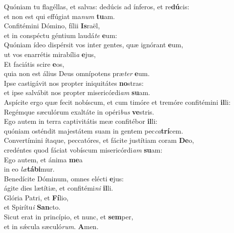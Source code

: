 \evenverse Quóniam tu flagéllas, et salvas: dedúcis ad ínferos, et re\textbf{dú}cis:~\*\\
\evenverse et non est qui effúgiat ma\textit{num} \textbf{tu}am.\\
\oddverse Confitémini Dómino, fílii \textbf{Is}raël,~\*\\
\oddverse et in conspéctu géntium laudá\textit{te} \textbf{e}um:\\
\evenverse Quóniam ídeo dispérsit vos inter gentes, quæ ignórant \textbf{e}um,~\*\\
\evenverse ut vos enarrétis mirabíli\textit{a} \textbf{e}jus,\\
\oddverse Et faciátis scire \textbf{e}os,~\*\\
\oddverse quia non est álius Deus omnípotens præ\textit{ter} \textbf{e}um.\\
\evenverse Ipse castigávit nos propter iniquitátes \textbf{no}stras:~\*\\
\evenverse et ipse salvábit nos propter misericórdi\textit{am} \textbf{su}am.\\
\oddverse Aspícite ergo quæ fecit nobíscum, et cum timóre et tremóre confitémini \textbf{il}li:~\*\\
\oddverse Regémque sæculórum exaltáte in opéri\textit{bus} \textbf{ve}stris.\\
\evenverse Ego autem in terra captivitátis meæ confitébor \textbf{il}li:~\*\\
\evenverse quóniam osténdit majestátem suam in gentem pec\textit{ca}\textbf{trí}cem.\\
\oddverse Convertímini ítaque, peccatóres, et fácite justítiam coram \textbf{De}o,~\*\\
\oddverse credéntes quod fáciat vobíscum misericórdi\textit{am} \textbf{su}am:\\
\evenverse Ego autem, et ánima \textbf{me}a~\*\\
\evenverse in eo \textit{læ}\textbf{tá}\textbf{bi}mur.\\
\oddverse Benedícite Dóminum, omnes elécti \textbf{e}jus:~\*\\
\oddverse ágite dies lætítiæ, et confitémi\textit{ni} \textbf{il}li.\\
\evenverse Glória Patri, et \textbf{Fí}lio,~\*\\
\evenverse et Spirítu\textit{i} \textbf{San}cto.\\
\oddverse Sicut erat in princípio, et nunc, et \textbf{sem}per,~\*\\
\oddverse et in sǽcula sæculó\textit{rum}. \textbf{A}men.\\
